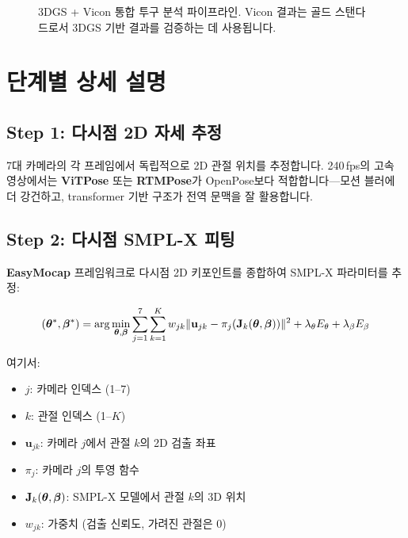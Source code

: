 \documentclass[11pt, a4paper]{report}
\begin{document}
\begin{figure}[H]
\caption{3DGS + Vicon 통합 투구 분석 파이프라인. Vicon 결과는 골드 스탠다드로서 3DGS 기반 결과를 검증하는 데 사용됩니다.}
\label{fig:pitching_pipeline}
\end{figure}

\section{단계별 상세 설명}

\subsection{Step 1: 다시점 2D 자세 추정}

7대 카메라의 각 프레임에서 독립적으로 2D 관절 위치를 추정합니다. 240\,fps의 고속 영상에서는 \textbf{ViTPose} 또는 \textbf{RTMPose}가 OpenPose보다 적합합니다---모션 블러에 더 강건하고, transformer 기반 구조가 전역 문맥을 잘 활용합니다.

\subsection{Step 2: 다시점 SMPL-X 피팅}

\textbf{EasyMocap} 프레임워크로 다시점 2D 키포인트를 종합하여 SMPL-X 파라미터를 추정:

\begin{equation}
(\bm{\theta}^*, \bm{\beta}^*) = \arg\min_{\bm{\theta}, \bm{\beta}} \sum_{j=1}^{7} \sum_{k=1}^{K} w_{jk} \| \mathbf{u}_{jk} - \pi_j(\mathbf{J}_k(\bm{\theta}, \bm{\beta})) \|^2 + \lambda_\theta E_\theta + \lambda_\beta E_\beta
\label{eq:multiview_smpl}
\end{equation}

여기서:
\begin{itemize}[leftmargin=*]
  \item $j$: 카메라 인덱스 (1--7)
  \item $k$: 관절 인덱스 (1--$K$)
  \item $\mathbf{u}_{jk}$: 카메라 $j$에서 관절 $k$의 2D 검출 좌표
  \item $\pi_j$: 카메라 $j$의 투영 함수
  \item $\mathbf{J}_k(\bm{\theta}, \bm{\beta})$: SMPL-X 모델에서 관절 $k$의 3D 위치
  \item $w_{jk}$: 가중치 (검출 신뢰도, 가려진 관절은 0)
\end{itemize}
\end{document}
